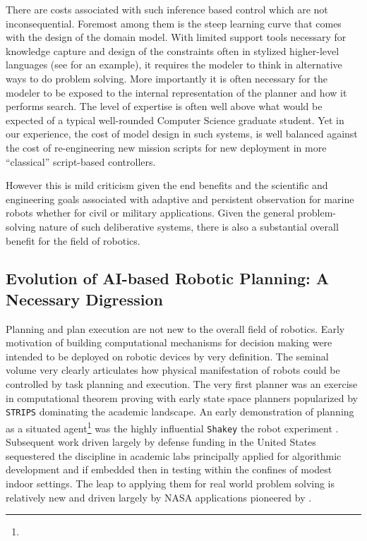 There are costs associated with such inference based control which are
not inconsequential. Foremost among them is the steep learning curve
that comes with the design of the domain model. With limited support
tools necessary for knowledge capture and design of the constraints
often in stylized higher-level languages (see \cite{NDDL} for an
example), it requires the modeler to think in alternative ways to do
problem solving. More importantly it is often necessary for the
modeler to be exposed to the internal representation of the planner
and how it performs search. The level of expertise is often well above
what would be expected of a typical well-rounded Computer Science
graduate student. Yet in our experience, the cost of model design in
such systems, is well balanced against the cost of re-engineering new
mission scripts for new deployment in more ``classical'' script-based
controllers.

However this is mild criticism given the end benefits and the
scientific and engineering goals associated with adaptive and
persistent observation for marine robots whether for civil or military
applications. Given the general problem-solving nature of such
deliberative systems, there is also a substantial overall benefit for
the field of robotics. 

\subsection{Evolution of AI-based Robotic Planning: A Necessary Digression}
\label{sec:related:robotplans}

Planning and plan execution are not new to the overall field of
robotics. Early motivation of building computational mechanisms for
decision making were intended to be deployed on robotic devices by
very definition. The seminal volume \cite{computersthought} very
clearly articulates how physical manifestation of robots could be
controlled by task planning and execution. The very first planner
\cite{green69} was an exercise in computational theorem proving with
early state space planners popularized by \texttt{STRIPS}
\cite{strips71} dominating the academic landscape. An early
demonstration of planning as a situated agent\footnote{} was the highly influential \texttt{Shakey} the
robot experiment \cite{shakey84}. Subsequent work driven largely by
defense funding in the United States sequestered the discipline in
academic labs principally applied for algorithmic development and if
embedded then in testing within the confines of modest indoor
settings. The leap to applying them for real world problem solving is
relatively new and driven largely by NASA applications pioneered by
\cite{mus94,mus98, jonsson00, rajan00, chien05, bresina05}.

